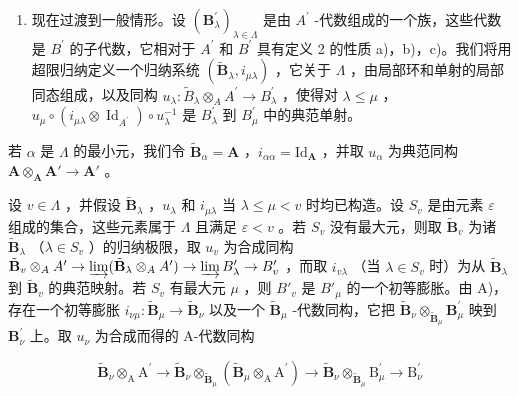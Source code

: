 \begin{enumerate}
\def\labelenumi{\Alph{enumi})}
\setcounter{enumi}{1}
\tightlist
\item
  现在过渡到一般情形。设 \((\mathbf{B}_{\lambda}^{\prime})_{\lambda\in\Lambda}\) 是由 \(A^{\prime}\) -代数组成的一个族，这些代数是 \(B^{\prime}\) 的子代数，它相对于 \(A^{\prime}\) 和 \(B^{\prime}\) 具有定义 2 的性质 a)，b)，c)。我们将用超限归纳定义一个归纳系统 \((\widetilde{\mathbf{B}}_{\lambda}, i_{\mu\lambda})\) ，它关于 \(\Lambda\) ，由局部环和单射的局部同态组成，以及同构 \(u_{\lambda}: \widetilde{B}_{\lambda} \otimes_{A} A^{\prime} \to B_{\lambda}^{\prime}\) ，使得对 \(\lambda \leqslant \mu\) ，\(u_{\mu} \circ (i_{\mu\lambda} \otimes \operatorname{Id}_{A^{\prime}}) \circ u_{\lambda}^{-1}\) 是 \(B_{\lambda}^{\prime}\) 到 \(B_{\mu}^{\prime}\) 中的典范单射。
\end{enumerate}

若 \(\alpha\) 是 \(\Lambda\) 的最小元，我们令 \(\tilde{\mathbf{B}}_{\alpha} = \mathbf{A}\) ，\(i_{\alpha \alpha} = \mathrm{Id}_{\mathbf{A}}\) ，并取 \(u_{\alpha}\) 为典范同构 \(\mathbf{A} \otimes_{\mathbf{A}} \mathbf{A}' \to \mathbf{A}'\) 。

设 \(v \in \Lambda\) ，并假设 \(\tilde{\mathbf{B}}_{\lambda}\) ，\(u_{\lambda}\) 和 \(i_{\mu \lambda}\) 当 \(\lambda \leqslant \mu < v\) 时均已构造。设 \(S_v\) 是由元素 \(\varepsilon\) 组成的集合，这些元素属于 \(\Lambda\) 且满足 \(\varepsilon < v\) 。若 \(S_v\) 没有最大元，则取 \(\tilde{\mathbf{B}}_v\) 为诸 \(\tilde{\mathbf{B}}_{\lambda}\) （\(\lambda \in S_v\) ）的归纳极限，取 \(u_v\) 为合成同构 \(\tilde{\mathbf{B}}_v \otimes_A A' \to \varinjlim (\tilde{\mathbf{B}}_{\lambda} \otimes_A A') \to \varinjlim B'_\lambda \to B'_v\) ，而取 \(i_{v\lambda}\) （当 \(\lambda \in S_v\) 时）为从 \(\tilde{\mathbf{B}}_{\lambda}\) 到 \(\tilde{\mathbf{B}}_v\) 的典范映射。若 \(S_v\) 有最大元 \(\mu\) ，则 \(B'_v\) 是 \(B'_\mu\) 的一个初等膨胀。由 A)，存在一个初等膨胀 \(i_{\nu \mu}:\tilde{\mathbf{B}}_{\mu}\to \tilde{\mathbf{B}}_{\nu}\) 以及一个 \(\tilde{\mathbf{B}}_{\mu}\) -代数同构，它把 \(\tilde{\mathbf{B}}_{\nu}\otimes_{\tilde{\mathbf{B}}_{\mu}}\mathbf{B}_{\mu}^{\prime}\) 映到 \(\mathbf{B}_{\nu}^{\prime}\) 上。取 \(u_{\nu}\) 为合成而得的 A-代数同构

\[
\widetilde {\mathbf {B}} _ {\nu} \otimes_ {\mathrm{A}} \mathrm{A} ^ {\prime} \rightarrow \widetilde {\mathbf {B}} _ {\nu} \otimes_ {\widetilde {\mathbf {B}} _ {\mu}} (\widetilde {\mathbf {B}} _ {\mu} \otimes_ {\mathrm{A}} \mathrm{A} ^ {\prime}) \rightarrow \widetilde {\mathbf {B}} _ {\nu} \otimes_ {\widetilde {\mathbf {B}} _ {\mu}} \mathrm{B} _ {\mu} ^ {\prime} \rightarrow \mathrm{B} _ {\nu} ^ {\prime}
\]


